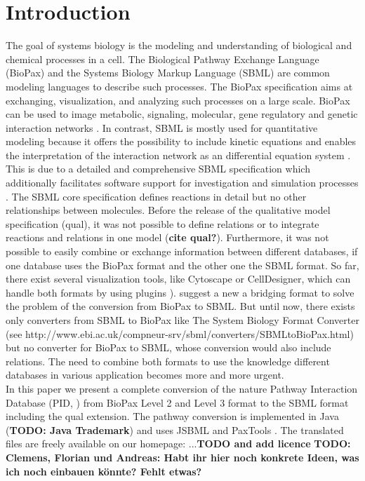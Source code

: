 \documentclass{bioinfo}
\begin{document}
\section{Introduction}
The goal of systems biology is the modeling and understanding of biological and chemical processes in a cell.
The Biological Pathway Exchange Language (BioPax) and the Systems Biology Markup Language (SBML) are common modeling languages to describe such processes.
The BioPax specification aims at exchanging, visualization, and analyzing such processes on a large scale.
BioPax can be used to image metabolic, signaling, molecular, gene regulatory and genetic interaction networks \citep{Demir2010}.
In contrast, SBML is mostly used for quantitative modeling because it offers the possibility to include kinetic equations and enables the interpretation of the interaction network as an differential equation system \citep{Hucka2003}.
This is due to a detailed and comprehensive SBML specification which additionally facilitates software support for investigation and simulation processes \citep{Draeger2008}.
The SBML core specification defines reactions in detail but no other relationships between molecules.
Before the release of the qualitative model specification (qual), it was not possible to define relations or to integrate reactions and relations in one model (\textbf{cite qual?}).
Furthermore, it was not possible to easily combine or exchange information between different databases, if one database uses the BioPax format and the other one the SBML format.
So far, there exist several visualization tools, like Cytoscape or CellDesigner, which can handle both formats by using plugins \citep{Mi2011, Draeger2008, Funahashi2007, Smoot2011a, Zinovyev2008}).
\citet*{Ruebenacker2009} suggest a new a bridging format to solve the problem of the conversion from BioPax to SBML.
But until now, there exists only converters from SBML to BioPax like The System Biology Format Converter (see http://www.ebi.ac.uk/compneur-srv/sbml/converters/SBMLtoBioPax.html) but no converter for BioPax to SBML, whose conversion would also include relations.
The need to combine both formats to use the knowledge different databases in various application becomes more and more urgent.\\
In this paper we present a complete conversion of the nature Pathway Interaction Database (PID, \citet{Schaefer2009}) from BioPax Level 2 and Level 3 format to the SBML format including the qual extension.
The pathway conversion is implemented in Java (\textbf{TODO: Java Trademark}) and uses JSBML \citep{Draeger2011} and PaxTools \citep{Demir2010}.
The translated files are freely available on our homepage: ...\textbf{TODO and add licence}
\textbf{TODO: Clemens, Florian und Andreas: Habt ihr hier noch konkrete Ideen, was ich noch einbauen k\"onnte? Fehlt etwas?}
\end{document}
